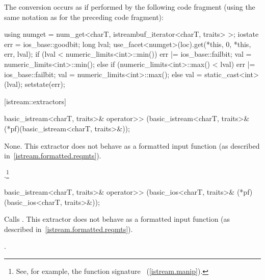 \begin{itemdescr}
\pnum
The conversion occurs as if performed by the following code fragment
(using the same notation as for the preceding code fragment):
\begin{codeblock}
using numget = num_get<charT, istreambuf_iterator<charT, traits> >;
iostate err = ios_base::goodbit;
long lval;
use_facet<numget>(loc).get(*this, 0, *this, err, lval);
if (lval < numeric_limits<int>::min()) {
  err |= ios_base::failbit;
  val = numeric_limits<int>::min();
} else if (numeric_limits<int>::max() < lval) {
  err |= ios_base::failbit;
  val = numeric_limits<int>::max();
}  else
  val = static_cast<int>(lval);
setstate(err);
\end{codeblock}
\end{itemdescr}

[istream::extractors]{}

%
%
\begin{itemdecl}
basic_istream<charT, traits>& operator>>
    (basic_istream<charT, traits>& (*pf)(basic_istream<charT, traits>&));
\end{itemdecl}

\begin{itemdescr}
\pnum
\effects
None.
This extractor does not behave as a formatted input function
(as described in~\ref{istream.formatted.reqmts}).

\pnum
\returns
{}.\footnote{See, for example, the function signature
~(\ref{istream.manip}).%
}
\end{itemdescr}

%
%
\begin{itemdecl}
basic_istream<charT, traits>& operator>>
    (basic_ios<charT, traits>& (*pf)(basic_ios<charT, traits>&));
\end{itemdecl}

\begin{itemdescr}
\pnum
\effects
Calls
.
This extractor does not behave as a formatted input function
(as described in~\ref{istream.formatted.reqmts}).

\pnum
\returns
{}.
\end{itemdescr}

